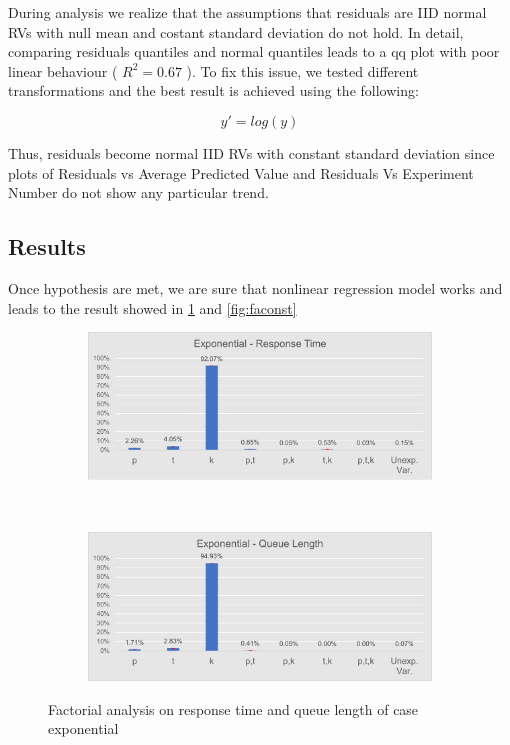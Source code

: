 \documentclass[a4paper,12pt]{article}
\begin{document}
During analysis we realize that the assumptions that residuals are IID normal RVs with null mean and costant standard deviation do not hold.
In detail, comparing residuals quantiles and normal quantiles leads to a qq plot with poor linear behaviour ( $R^2 = 0.67$ ). To fix this issue, we tested different transformations and the best result is achieved using the following:

$$y' = log(y)$$

Thus, residuals become normal IID RVs with constant standard deviation since plots of Residuals vs Average Predicted Value and Residuals Vs Experiment Number do not show any particular trend.

\subsection{Results}
Once hypothesis are met, we are sure that nonlinear regression model works and leads to the result showed in \ref{fig:faexp} and \ref{fig:faconst}

\begin{figure}[H]
  \centering
  \begin{subfigure}[b]{.45\textwidth}
    \includegraphics[width=\textwidth]{img/FactorAnalysisResponseTimeEXP.pdf}
  \end{subfigure}
  ~
  \begin{subfigure}[b]{.45\textwidth}
    \includegraphics[width=\textwidth]{img/FactorAnalysisQueueLengthEXP.pdf}
  \end{subfigure}
  \caption{Factorial analysis on response time and queue length of case exponential }
  \label{fig:faexp}
\end{figure}
\end{document}
